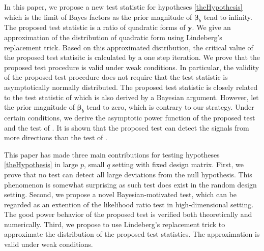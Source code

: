 \documentclass[smallextended]{svjour3}       %
\DeclareMathOperator{\myE}{E}
\DeclareMathOperator{\myVar}{Var}
\newcommand{\By}{\mathbf{y}}    \newcommand{\Bz}{\mathbf{z}}
\newcommand{\bfsym}[1]{\ensuremath{\boldsymbol{#1}}}
\def\bbeta{\bfsym \beta}
\begin{document}
In this paper, we propose a new test statistic for hypotheses \eqref{theHypothesis} which is the limit of Bayes factors as the prior magnitude of $\bbeta_b$ tend to infinity.
The proposed test statistic is a ratio of quadratic forms of $\By$.
We give an approximation of the distribution of quadratic form using Lindeberg's replacement trick.
Based on this approximated distribution, the critical value of the proposed test statisitc is calculated by a one step iteration.
We prove that the proposed test procedure is valid under weak conditions.
In particular, the validity of the proposed test procedure does not require that the test statistic is asymptotically normally distributed.
The proposed test statistic is closely related to the test statistic of \cite{Goeman2006} which is also derived by a Bayesian argument.
However, \cite{Goeman2006} let the prior magnitude of $\bbeta_b$ tend to zero, which is contrary to our strategy.
Under certain conditions, we derive the asymptotic power function of the proposed test and the test of \cite{Goeman2006}.
It is shown that the proposed test can detect the signals from more directions than the test of \cite{Goeman2006}.


This paper has made three main contributions for testing hypotheses \eqref{theHypothesis} in large $p$, small $q$ setting with fixed design matrix.
First, we prove that no test can detect all large deviations from the null hypothesis.
This phenomenon is somewhat surprising as such test does exist in the random design setting.
Second, we propose a novel Bayesian-motivated test, which can be regarded as an extention of the likelihood ratio test in high-dimensional setting.
The good power behavior of the proposed test is verified both theoretically and numerically.
Third, we propose to use Lindeberg's replacement trick to approximate the distribution of the proposed test statistics.
The approximation is valid under weak conditions.
\end{document}
